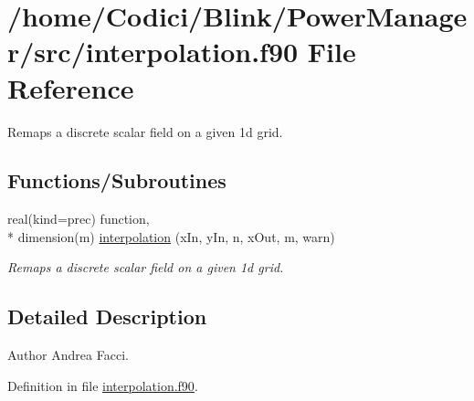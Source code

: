 \hypertarget{interpolation_8f90}{\section{/home/\-Codici/\-Blink/\-Power\-Manager/src/interpolation.f90 File Reference}
\label{interpolation_8f90}
}


Remaps a discrete scalar field on a given 1d grid.  


\subsection*{Functions/\-Subroutines}
\begin{DoxyCompactItemize}
\item 
real(kind=prec) function, \\*
dimension(m) \hyperlink{interpolation_8f90_af82151c6134b883711c2a1fa732ca69a}{interpolation} (x\-In, y\-In, n, x\-Out, m, warn)
\begin{DoxyCompactList}\small\item\em Remaps a discrete scalar field on a given 1d grid. \end{DoxyCompactList}\end{DoxyCompactItemize}


\subsection{Detailed Description}
\begin{DoxyAuthor}{Author}
Andrea Facci. 
\end{DoxyAuthor}


Definition in file \hyperlink{interpolation_8f90_source}{interpolation.\-f90}.




